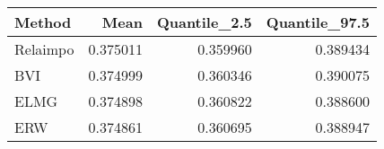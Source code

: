 \begin{table}[ht]
\centering
\begin{tabular}{lrrr}
  \hline
Method & Mean & Quantile\_2.5 & Quantile\_97.5 \\ 
  \hline
Relaimpo & 0.375011 & 0.359960 & 0.389434 \\ 
  BVI & 0.374999 & 0.360346 & 0.390075 \\ 
  ELMG & 0.374898 & 0.360822 & 0.388600 \\ 
  ERW & 0.374861 & 0.360695 & 0.388947 \\ 
   \hline
\end{tabular}
\end{table}
